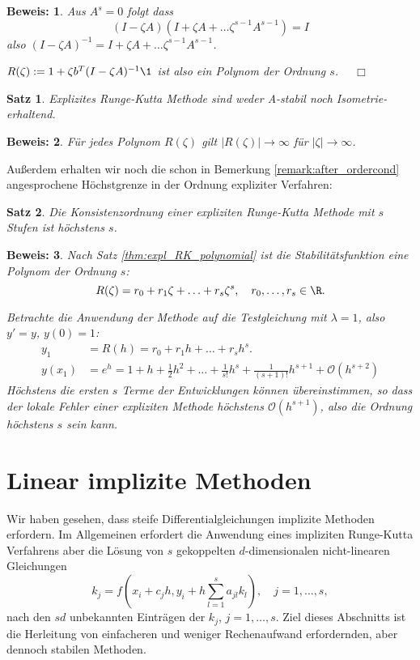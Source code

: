 \documentclass[
]{mycourse}
\theoremstyle{mythm}
\newtheorem{theorem}{Satz}[chapter]
\theoremstyle{break}
\newtheorem*{beweis}{Beweis:}
\begin{document}
\begin{beweis}
Aus $A^s=0$ folgt dass
\[
(I-\zeta A) ( I+\zeta A + \ldots \zeta^{s-1} A^{s-1}) = I
\]
also $(I-\zeta A)^{-1}=I+\zeta A + \ldots \zeta^{s-1} A^{s-1}$.

$R(\zeta):=1+\zeta b^T (I-\zeta A)^{-1} \1$ ist also ein Polynom der Ordnung $s$. $\quad \Box$
\end{beweis}

\begin{theorem}
Explizites Runge-Kutta Methode sind weder A-stabil noch Isometrie-erhaltend.
\end{theorem}
\begin{beweis}
Für jedes Polynom $R(\zeta)$ gilt $|R(\zeta)|\to \infty$ für $|\zeta|\to \infty$. 
\end{beweis}

Außerdem erhalten wir noch die schon in Bemerkung \ref{remark:after_ordercond} angesprochene 
Höchstgrenze in der Ordnung expliziter Verfahren:
\begin{theorem}
Die Konsistenzordnung einer expliziten Runge-Kutta Methode mit $s$ Stufen ist höchstens $s$.
\end{theorem}
\begin{beweis}
Nach Satz \ref{thm:expl_RK_polynomial} ist die Stabilitätsfunktion eine Polynom der Ordnung $s$:
\[
R(\zeta)=r_0+r_1\zeta+\ldots+r_s \zeta^s,\quad r_0,\ldots,r_s\in \R.
\]

Betrachte die Anwendung der Methode auf die Testgleichung mit $\lambda=1$, also $y'=y$, $y(0)=1$:
\begin{align*}
y_1&=R(h)=r_0+r_1 h+\ldots+r_s h^s.\\
y(x_1)&=e^{h}=1+h+\frac{1}{2}h^2+\ldots +\frac{1}{s!} h^s + \frac{1}{(s+1)!} h^{s+1} + \mathcal{O}(h^{s+2})
\end{align*}
Höchstens die ersten $s$ Terme der Entwicklungen können übereinstimmen, so dass der lokale Fehler einer
expliziten Methode höchstens $\mathcal{O}(h^{s+1})$, also die Ordnung höchstens $s$ sein kann.
\end{beweis}



\section{Linear implizite Methoden}

Wir haben gesehen, dass steife Differentialgleichungen implizite Methoden erfordern. Im Allgemeinen
erfordert die Anwendung eines impliziten Runge-Kutta Verfahrens aber die Lösung
von $s$ gekoppelten $d$-dimensionalen nicht-linearen Gleichungen 
\[
k_j=f(x_i+c_j h, y_i + h \sum_{l=1}^s a_{jl} k_l), \quad j=1,\ldots,s,
\]
nach den $sd$ unbekannten Einträgen der $k_j$, $j=1,\ldots,s$. Ziel dieses Abschnitts 
ist die Herleitung von einfacheren und weniger Rechenaufwand erfordernden, aber dennoch stabilen Methoden.
\end{document}
